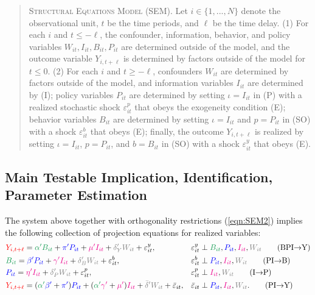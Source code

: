 \documentclass[3p, longtitle]{elsarticle}
\theoremstyle{definition}
\renewcommand{\to}{{\rightarrow}}
\def\bcolor{\color{ForestGreen}}
\def\pcolor{\color{blue}}
\def\icolor{\color{magenta}}
\def\wcolor{\color{gray}}
\def\ycolor{\color{red}}
\begin{document}
\begin{quote}
\textsc{Structural Equations Model (SEM)}.  Let $i \in \{1,..., N\}$ denote the observational unit,  $t$ be the time periods, and $\ell$ be the time delay.  (1) For each $i$ and $t \leq -\ell$, the confounder, information, behavior, and policy variables $W_{it}, I_{it},  B_{it}, P_{it}$ are determined outside of the model, and the outcome variable $Y_{i, t+\ell}$ is determined by factors outside of the model for $t \leq 0$.  (2) For each $i$ and $t \geq -\ell$, confounders $W_{it}$ are  determined by factors outside of the model, and information variables $I_{it}$ are determined  by (I); policy variables $P_{it}$ are determined by setting $\iota = I_{it}$  in (P) with  a realized stochastic shock $\varepsilon^p_{it}$ that obeys the exogeneity condition (E);  behavior variables $B_{it}$ are determined by setting $\iota = I_{it}$ and $p= P_{it}$ in  (SO) with a shock $\varepsilon^b_{it}$ that obeys (E); finally, the outcome $Y_{i, t + \ell}$ is realized by setting $\iota = I_{it}$, $p= P_{it}$, and $b = B_{it}$ in  (SO) with a shock $\varepsilon^y_{it}$ that obeys (E). \end{quote}




\subsection{Main Testable Implication, Identification, Parameter Estimation}

The system above together with  orthogonality restrictions (\ref{eqn:SEM2}) implies the following collection of projection equations for realized variables:
\begin{align}
   &  {\ycolor  Y_{i,t+\ell}}
    = {\bcolor\alpha ' B_{it}} + {\pcolor\pi 'P_{it}} + {\icolor\mu'I_{it}} + {\wcolor\delta_Y 'W_{it}}  + \varepsilon^y_{it},
    &  & \varepsilon^y_{it} \perp {\bcolor B_{it}}, {\pcolor P_{it}}, {\icolor I_{it}}, {\wcolor W_{it}} \label{eq:R1} \tag{BPI$\to$Y} \\
    &  {\bcolor B_{it}}
     =  {\pcolor \beta' P_{it}} + {\icolor \gamma'I_{it}} +  {\wcolor \delta_B' W_{it}} + \varepsilon^b_{it},
   & & \varepsilon^b_{it} \perp {\pcolor P_{it}}, {\icolor I_{it}}, {\wcolor W_{it}}  \label{eq:R2} \tag{PI$\to$B}  \\
    & {\pcolor P_{it}}
    =  {\icolor\eta'I_{it}} + {\wcolor \delta_P' W_{it}} +   \varepsilon^p_{it},   & & \varepsilon^p_{it} \perp   {\icolor I_{it}}, {\wcolor W_{it}}  \label{eq:R3}  \tag{I$\to$P} \\
    &  {\ycolor  Y_{i,t+\ell}}
   =     ( {\bcolor\alpha '}  {\pcolor \beta' }+{\pcolor\pi'} )   {\pcolor P_{it}} +    ( {\bcolor\alpha '}  {\icolor \gamma'} + {\icolor \mu'}){\icolor I_{it} }+ {\wcolor \bar{\delta} '}{\wcolor W_{it}}  + {\bar \varepsilon}_{it},  &&  {\bar \varepsilon}_{it} \perp
  {\pcolor P_{it}},  {\icolor I_{it}}, {\wcolor W_{it}}.  \label{eq:R4} \tag{PI$\to$Y}
      \end{align}
\end{document}
